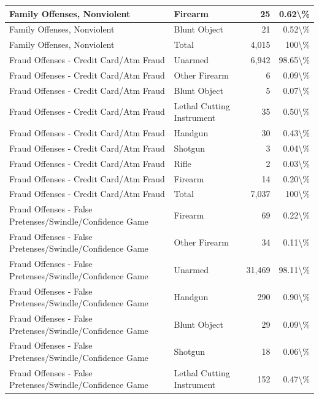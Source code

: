\documentclass[
]{krantz}
\begin{document}
\begin{longtable}[t]{l|l|r|r}
\hline
Family Offenses, Nonviolent & Firearm & 25 & 0.62\textbackslash{}\%\\
\hline
Family Offenses, Nonviolent & Blunt Object & 21 & 0.52\textbackslash{}\%\\
\hline
Family Offenses, Nonviolent & Total & 4,015 & 100\textbackslash{}\%\\
\hline
Fraud Offenses - Credit Card/Atm Fraud & Unarmed & 6,942 & 98.65\textbackslash{}\%\\
\hline
Fraud Offenses - Credit Card/Atm Fraud & Other Firearm & 6 & 0.09\textbackslash{}\%\\
\hline
Fraud Offenses - Credit Card/Atm Fraud & Blunt Object & 5 & 0.07\textbackslash{}\%\\
\hline
Fraud Offenses - Credit Card/Atm Fraud & Lethal Cutting Instrument & 35 & 0.50\textbackslash{}\%\\
\hline
Fraud Offenses - Credit Card/Atm Fraud & Handgun & 30 & 0.43\textbackslash{}\%\\
\hline
Fraud Offenses - Credit Card/Atm Fraud & Shotgun & 3 & 0.04\textbackslash{}\%\\
\hline
Fraud Offenses - Credit Card/Atm Fraud & Rifle & 2 & 0.03\textbackslash{}\%\\
\hline
Fraud Offenses - Credit Card/Atm Fraud & Firearm & 14 & 0.20\textbackslash{}\%\\
\hline
Fraud Offenses - Credit Card/Atm Fraud & Total & 7,037 & 100\textbackslash{}\%\\
\hline
Fraud Offenses - False Pretenses/Swindle/Confidence Game & Firearm & 69 & 0.22\textbackslash{}\%\\
\hline
Fraud Offenses - False Pretenses/Swindle/Confidence Game & Other Firearm & 34 & 0.11\textbackslash{}\%\\
\hline
Fraud Offenses - False Pretenses/Swindle/Confidence Game & Unarmed & 31,469 & 98.11\textbackslash{}\%\\
\hline
Fraud Offenses - False Pretenses/Swindle/Confidence Game & Handgun & 290 & 0.90\textbackslash{}\%\\
\hline
Fraud Offenses - False Pretenses/Swindle/Confidence Game & Blunt Object & 29 & 0.09\textbackslash{}\%\\
\hline
Fraud Offenses - False Pretenses/Swindle/Confidence Game & Shotgun & 18 & 0.06\textbackslash{}\%\\
\hline
Fraud Offenses - False Pretenses/Swindle/Confidence Game & Lethal Cutting Instrument & 152 & 0.47\textbackslash{}\%\\
\hline

\end{longtable}
\end{document}
